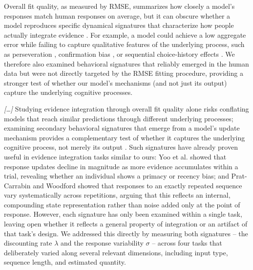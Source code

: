 \begin{ms}
Overall fit quality, as measured by RMSE, summarizes how closely a model's responses match human responses on average, but it can obscure whether a model reproduces specific dynamical signatures that characterize how people actually integrate evidence \citep{palminteri2017falsification, wilson2019ten}. For example, a model could achieve a low aggregate error while failing to capture qualitative features of the underlying process, such as perseveration \citep{katahira2018statistical}, confirmation bias \citep{palminteri2017confirmation, palminteri2022computational}, or sequential choice-history effects \citep{yu2008sequential, zhang2014sequential}. We therefore also examined behavioral signatures that reliably emerged in the human data but were not directly targeted by the RMSE fitting procedure, providing a stronger test of whether our model's mechanisms (and not just its output) capture the underlying cognitive processes.

\textit{[\ldots]} Studying evidence integration through overall fit quality alone risks conflating models that reach similar predictions through different underlying processes; examining secondary behavioral signatures that emerge from a model's update mechanism provides a complementary test of whether it captures the underlying cognitive process, not merely its output \citep{palminteri2017falsification, wilson2019ten}. Such signatures have already proven useful in evidence integration tasks similar to ours: Yoo et al. \citep{yoo2025people} showed that response updates decline in magnitude as more evidence accumulates within a trial, revealing whether an individual shows a primacy or recency bias; and Prat-Carrabin and Woodford \citep{prat2024imprecise} showed that responses to an exactly repeated sequence vary systematically across repetitions, arguing that this reflects an internal, compounding state representation rather than noise added only at the point of response. However, each signature has only been examined within a single task, leaving open whether it reflects a general property of integration or an artifact of that task's design. We addressed this directly by measuring both signatures -- the discounting rate $\lambda$ and the response variability $\sigma$ -- across four tasks that deliberately varied along several relevant dimensions, including input type, sequence length, and estimated quantity.
\end{ms}


